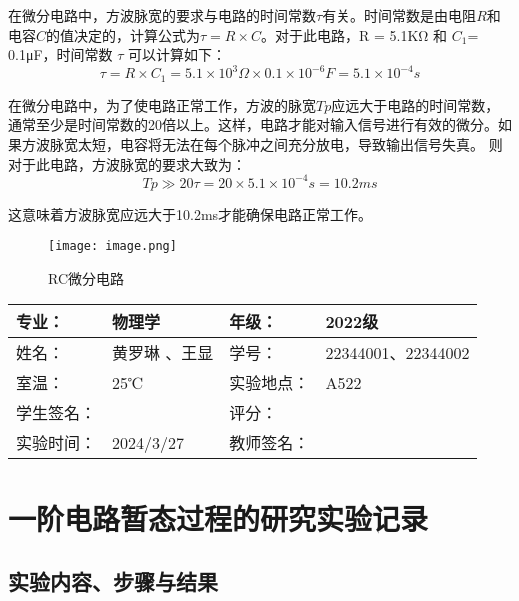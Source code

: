 \documentclass[dvipsnames, svgnames,a4paper,11pt]{article}
\begin{document}
		在微分电路中，方波脉宽的要求与电路的时间常数$\tau$有关。时间常数是由电阻$R$和电容$C$的值决定的，计算公式为$ \tau = R \times C$。对于此电路，R = 5.1KΩ 和 $C_1$​ = 0.1μF，时间常数 $\tau$ 可以计算如下：
		\[
			\tau=R\times C_1​=5.1\times10^3\Omega×0.1×10^{−6}F=5.1×10^{−4}s
		\]
		
		在微分电路中，为了使电路正常工作，方波的脉宽$Tp$应远大于电路的时间常数，通常至少是时间常数的20倍以上。这样，电路才能对输入信号进行有效的微分。如果方波脉宽太短，电容将无法在每个脉冲之间充分放电，导致输出信号失真。
		则对于此电路，方波脉宽的要求大致为：
		\[
			Tp\gg20\tau=20×5.1×10^{−4}s=10.2ms
		\]
		
		这意味着方波脉宽应远大于10.2ms才能确保电路正常工作。

		\begin{figure}[htbp]
			\centering
			\texttt{[image: image.png]}
			\caption{RC微分电路}
			\label{fig:graph1}
		\end{figure}

	
	
	
	
	
	\clearpage
	
	\begin{table}
		\renewcommand\arraystretch{1.7}
		\centering
		\begin{tabularx}{\textwidth}{|X|X|X|X|}
			\hline
			专业： & 物理学 & 年级： & 2022级 \\
			\hline
			姓名： & 黄罗琳 、王显& 学号： &22344001、22344002 \\
			\hline
			室温： & 25℃ & 实验地点： & A522 \\
			\hline
			学生签名：&  & 评分： &\\
			\hline
			实验时间：& 2024/3/27 & 教师签名：&\\
			\hline
		\end{tabularx}
	\end{table}
	
	\section{一阶电路暂态过程的研究\quad\heiti 实验记录}
	
	\subsection{实验内容、步骤与结果}
	
\end{document}
